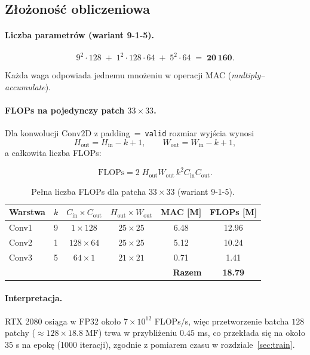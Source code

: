 \documentclass[11pt]{article}
\begin{document}
\subsection{Złożoność obliczeniowa}
\label{sec:flops}

\paragraph{Liczba parametrów (wariant 9-1-5).}

\[
  9^{2}\!\cdot\!128
  \;+\;
  1^{2}\!\cdot\!128\!\cdot\!64
  \;+\;
  5^{2}\!\cdot\!64
  \;=\;
  \mathbf{20\,160}.
\]

Każda waga odpowiada jednemu mnożeniu w operacji MAC
(\emph{multiply–accumulate}).

\bigskip
\paragraph{FLOPs na pojedynczy patch \(33\times33\).}

Dla konwolucji \(\text{Conv2D}\) z padding~=~\texttt{valid} rozmiar wyjścia
wynosi
\[
  H_\text{out}=H_\text{in}-k+1,\qquad
  W_\text{out}=W_\text{in}-k+1,
\]
a całkowita liczba FLOPs:

\[
  \text{FLOPs}=2\;H_\text{out}W_\text{out}\,k^{2}C_\text{in}C_\text{out}.
\]

\begin{table}[h]
\centering
\begin{tabular}{@{}lccccc@{}}
\toprule
Warstwa & $k$ & $C_\text{in}\!\times C_\text{out}$ &
$H_\text{out}\!\times W_\text{out}$ & MAC [M] & FLOPs [M] \\ \midrule
Conv1 & 9 & $1\times 128$   & $25\times25$ & 6.48 & 12.96 \\
Conv2 & 1 & $128\times 64$  & $25\times25$ & 5.12 & 10.24 \\
Conv3 & 5 & $64\times 1$    & $21\times21$ & 0.71 & 1.41  \\ \midrule
\multicolumn{5}{r}{\textbf{Razem}} & \textbf{18.79} \\
\bottomrule
\end{tabular}
\caption{Pełna liczba FLOPs dla patcha \(33\times33\) (wariant 9-1-5).}
\label{tab:flops}
\end{table}

\paragraph{Interpretacja.}
RTX 2080 osiąga w FP32 około \(7\!\times\!10^{12}\) FLOPs/s, więc
przetworzenie batcha \(128\) patchy (\(\approx 128\!\times18.8\;\text{MF}\))
trwa w przybliżeniu \(0.45\) ms, co przekłada się na
około \(35\) s na epokę (1000 iteracji), zgodnie z pomiarem czasu w
rozdziale~\ref{sec:train}.
\end{document}

